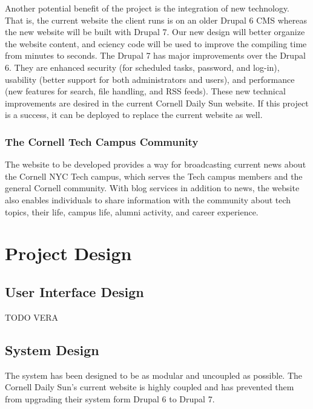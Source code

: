 \documentclass[11pt]{article} %
\begin{document}
Another potential benefit of the project is the integration of new technology. That is, the current website the client runs is on an older Drupal 6 CMS whereas the new website will be built with Drupal 7. Our new design will better organize the website content, and eciency code will be used to improve the compiling time from minutes to seconds. The Drupal 7 has major improvements over the Drupal 6. They are enhanced security (for scheduled tasks, password, and log-in), usability (better support for both administrators and users), and performance (new features for search, file handling, and RSS feeds). These new technical improvements are desired in the current Cornell Daily Sun website. If this project is a success, it can be deployed to replace the current website as well.
                   
\subsubsection{The Cornell Tech Campus Community}
                   
The website to be developed provides a way for broadcasting current news about the Cornell NYC Tech campus, which serves the Tech campus members and the general Cornell community. With blog services in addition to news, the website also enables individuals to share information with the community about tech topics, their life, campus life, alumni activity, and career experience. 

\section{Project Design}

\subsection{User Interface Design}

TODO VERA

\subsection{System Design}

The system has been designed to be as modular and uncoupled as possible. The Cornell Daily Sun’s current website is highly coupled and has prevented them from upgrading their system form Drupal 6 to Drupal 7.
\end{document}
